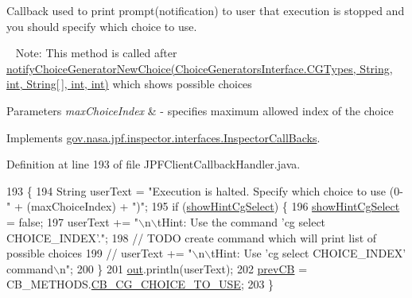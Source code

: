 Callback used to print prompt(notification) to user that execution is stopped and you should specify which choice to use. 

~\newline
Note\+: This method is called after \hyperlink{}{notify\+Choice\+Generator\+New\+Choice(\+Choice\+Generators\+Interface.\+C\+G\+Types, String, int, String\mbox{[}$\,$\mbox{]}, int, int)} which shows possible choices


\begin{DoxyParams}{Parameters}
{\em max\+Choice\+Index} & -\/ specifies maximum allowed index of the choice \\
\hline
\end{DoxyParams}


Implements \hyperlink{interfacegov_1_1nasa_1_1jpf_1_1inspector_1_1interfaces_1_1_inspector_call_backs_a95bd37f4f3ad147514c86fa77856b51d}{gov.\+nasa.\+jpf.\+inspector.\+interfaces.\+Inspector\+Call\+Backs}.



Definition at line 193 of file J\+P\+F\+Client\+Callback\+Handler.\+java.


\begin{DoxyCode}
193                                                       \{
194     String userText = \textcolor{stringliteral}{"Execution is halted. Specify which choice to use (0-"} + (maxChoiceIndex) + \textcolor{stringliteral}{")"};
195     \textcolor{keywordflow}{if} (\hyperlink{classgov_1_1nasa_1_1jpf_1_1inspector_1_1client_1_1_j_p_f_client_callback_handler_aa541c0527efe7beb63c26022ed9d9dba}{showHintCgSelect}) \{
196       \hyperlink{classgov_1_1nasa_1_1jpf_1_1inspector_1_1client_1_1_j_p_f_client_callback_handler_aa541c0527efe7beb63c26022ed9d9dba}{showHintCgSelect} = \textcolor{keyword}{false};
197       userText += \textcolor{stringliteral}{"\(\backslash\)n\(\backslash\)tHint: Use the command 'cg select CHOICE\_INDEX'."};
198       \textcolor{comment}{// TODO create command which will print list of possible choices}
199       \textcolor{comment}{// userText += "\(\backslash\)n\(\backslash\)tHint: Use 'cg select CHOICE\_INDEX' command\(\backslash\)n";}
200     \}
201     \hyperlink{classgov_1_1nasa_1_1jpf_1_1inspector_1_1client_1_1_j_p_f_client_callback_handler_ad51e474b5613fa4a46c8965c069fb9f7}{out}.println(userText);
202     \hyperlink{classgov_1_1nasa_1_1jpf_1_1inspector_1_1client_1_1_j_p_f_client_callback_handler_a1e5272638212d9246e98ced9a5a78012}{prevCB} = CB\_METHODS.\hyperlink{enumgov_1_1nasa_1_1jpf_1_1inspector_1_1interfaces_1_1_inspector_call_backs_1_1_c_b___m_e_t_h_o_d_s_a5f2445ac00ef4121d8d4b766f24ca461}{CB\_CG\_CHOICE\_TO\_USE};
203   \}
\end{DoxyCode}


